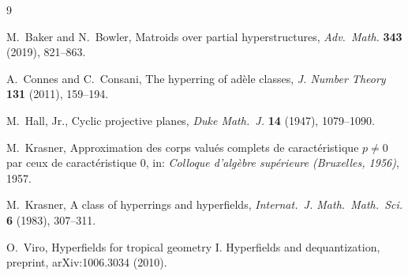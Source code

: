 \documentclass[11pt]{article}
\theoremstyle{definition}
\theoremstyle{remark}
\begin{document}
\begin{thebibliography}{9}

M.~Baker and N.~Bowler,
Matroids over partial hyperstructures,
\emph{Adv.\ Math.} \textbf{343} (2019), 821--863.

A.~Connes and C.~Consani,
The hyperring of ad\`ele classes,
\emph{J. Number Theory} \textbf{131} (2011), 159--194.

M.~Hall, Jr.,
Cyclic projective planes,
\emph{Duke Math.\ J.} \textbf{14} (1947), 1079--1090.

M.~Krasner,
Approximation des corps valu\'es complets de caract\'eristique $p\neq0$ par ceux de caract\'eristique $0$,
in: \emph{Colloque d'alg\`ebre sup\'erieure (Bruxelles, 1956)}, 1957.

M.~Krasner,
A class of hyperrings and hyperfields,
\emph{Internat.\ J. Math.\ Math.\ Sci.} \textbf{6} (1983), 307--311.

O.~Viro,
Hyperfields for tropical geometry I. Hyperfields and dequantization,
preprint, arXiv:1006.3034 (2010).

\end{thebibliography}
\end{document}

